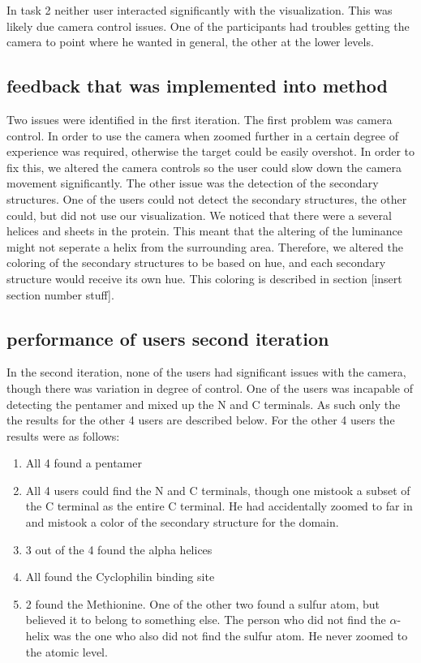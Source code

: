 \documentclass[review,journal]{vgtc}         %
\begin{document}
In task 2 neither user interacted significantly with the visualization. This was likely due camera control issues. 
One of the participants had troubles getting the camera to point where he wanted in general, the other at the lower levels.

\subsection{feedback that was implemented into method}
Two issues were identified in the first iteration. 
The first problem was camera control. 
In order to use the camera when zoomed further in a certain degree of experience was required, otherwise the target could be easily overshot.
In order to fix this, we altered the camera controls so the user could slow down the camera movement significantly.
The other issue was the detection of the secondary structures. 
One of the users could not detect the secondary structures, the other could, but did not use our visualization.
We noticed that there were a several helices and sheets in the protein. 
This meant that the altering of the luminance might not seperate a helix from the surrounding area. 
Therefore, we altered the coloring of the secondary structures to be based on hue, and each secondary structure would receive its own hue.
This coloring is described in section [insert section number stuff].


\subsection{performance of users second iteration}
In the second iteration, none of the users had significant issues with the camera, though there was variation in degree of control.
One of the users was incapable of detecting the pentamer and mixed up the N and C terminals. 
As such only the the results for the other 4 users are described below. 
For the other 4 users the results were as follows:

\begin{enumerate}
	\item All 4 found a pentamer
	\item All 4 users could find the N and C terminals, though one mistook a subset of the C terminal as the entire C terminal. He had accidentally zoomed to far in and mistook a color of the secondary structure for the domain.
	\item 3 out of the 4 found the alpha helices
	\item All found the Cyclophilin binding site
	\item 2 found the Methionine. One of the other two found a sulfur atom, but believed it to belong to something else. The person who did not find the $\alpha$-helix was the one who also did not find the sulfur atom. He never zoomed to the atomic level.
\end{enumerate}
\end{document}
